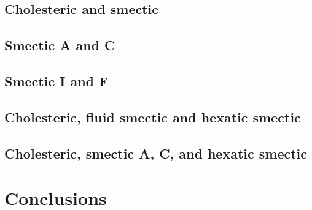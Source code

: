 \documentclass[12pt]{article}
\begin{document}
\subsection{Cholesteric and smectic}

\subsection{Smectic A and C}

\subsection{Smectic I and F}

\subsection{Cholesteric, fluid smectic and hexatic smectic}

\subsection{Cholesteric, smectic A, C, and hexatic smectic}

\section{Conclusions}



\appendix
\appendixpage
\end{document}
